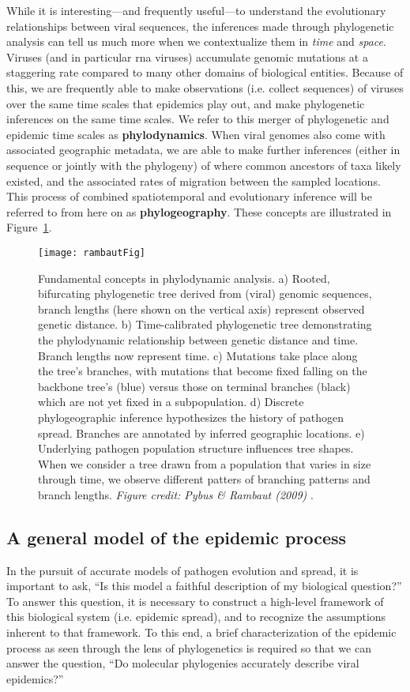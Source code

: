 While it is interesting---and frequently useful---to understand the evolutionary relationships between viral sequences, the inferences made through phylogenetic analysis can tell us much more when we contextualize them in \textit{time} and \textit{space}.
Viruses (and in particular \gls{rna} viruses) accumulate genomic mutations at a staggering rate compared to many other domains of biological entities.
Because of this, we are frequently able to make observations (i.e. collect sequences) of viruses over the same time scales that epidemics play out, and make phylogenetic inferences on the same time scales.
We refer to this merger of phylogenetic and epidemic time scales as \textbf{phylodynamics}.
When viral genomes also come with associated geographic metadata, we are able to make further inferences (either in sequence or jointly with the phylogeny) of where common ancestors of taxa likely existed, and the associated rates of migration between the sampled locations.
This process of combined spatiotemporal and evolutionary inference will be referred to from here on as \textbf{phylogeography}.
These concepts are illustrated in Figure~\ref{fig:phylogeneticsOverview}.

\begin{figure}[ht]
  \centering
  \texttt{[image: rambautFig]}
  \caption[Applications of phylodynamics]{Fundamental concepts in phylodynamic analysis. a) Rooted, bifurcating phylogenetic tree derived from (viral) genomic sequences, branch lengths (here shown on the vertical axis) represent observed genetic distance. b) Time-calibrated phylogenetic tree demonstrating the phylodynamic relationship between genetic distance and time. Branch lengths now represent time. c) Mutations take place along the tree's branches, with mutations that become fixed falling on the backbone tree's (blue) versus those on terminal branches (black) which are not yet fixed in a subpopulation. d) Discrete phylogeographic inference hypothesizes the history of pathogen spread. Branches are annotated by inferred geographic locations. e) Underlying pathogen population structure influences tree shapes. When we consider a tree drawn from a population that varies in size through time, we observe different patters of branching patterns and branch lengths.
  \textit{Figure credit: Pybus \& Rambaut (2009)} \citep{pybus2009evolutionary}.
  }
  \label{fig:phylogeneticsOverview}
\end{figure}

\subsection{A general model of the epidemic process}
In the pursuit of accurate models of pathogen evolution and spread, it is important to ask, ``Is this model a faithful description of my biological question?''
To answer this question, it is necessary to construct a high-level framework of this biological system (i.e. epidemic spread), and to recognize the assumptions inherent to that framework.
To this end, a brief characterization of the epidemic process as seen through the lens of phylogenetics is required so that we can answer the question, ``Do molecular phylogenies accurately describe viral epidemics?''


